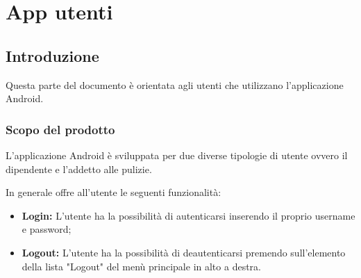 \section{App utenti}
\subsection{Introduzione}
Questa parte del documento è orientata agli utenti che utilizzano l'applicazione Android.

\subsubsection{Scopo del prodotto}
L'applicazione Android è sviluppata per due diverse tipologie di utente ovvero il dipendente e l'addetto alle pulizie.

In generale offre all'utente le seguenti funzionalità:
\begin{itemize}
	\item \textbf{Login:} L'utente ha la possibilità di autenticarsi inserendo il proprio username e password; \\
	\item \textbf{Logout:} L'utente ha la possibilità di deautenticarsi premendo sull'elemento della lista "Logout" del menù principale in alto a destra. \\
\end{itemize}

